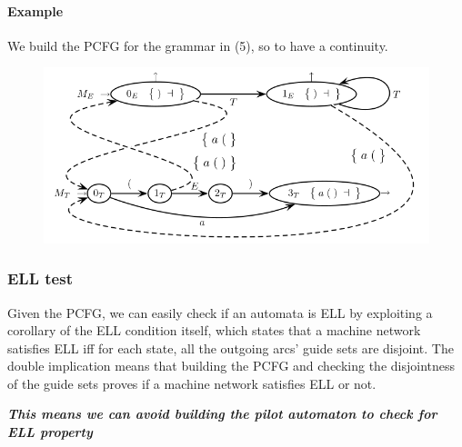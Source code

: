 				\paragraph{Example}
					We build the PCFG for the grammar in (5), so to have a continuity.
					\begin{figure}[H]
						\centering
						\includegraphics[width = \textwidth]{./images/PCFG.png}
					\end{figure}
			 
			\subsubsection{ELL test}
				Given the PCFG, we can easily check if an automata is ELL by exploiting a corollary of the ELL condition itself, which states that a machine network 
				satisfies ELL iff for each state, all the outgoing arcs' guide sets are disjoint. The double implication means that building the PCFG and checking 
				the disjointness of the guide sets proves if a machine network satisfies ELL or not.

				\emph{\textbf{This means we can avoid building the pilot automaton to check for ELL property}}
				
